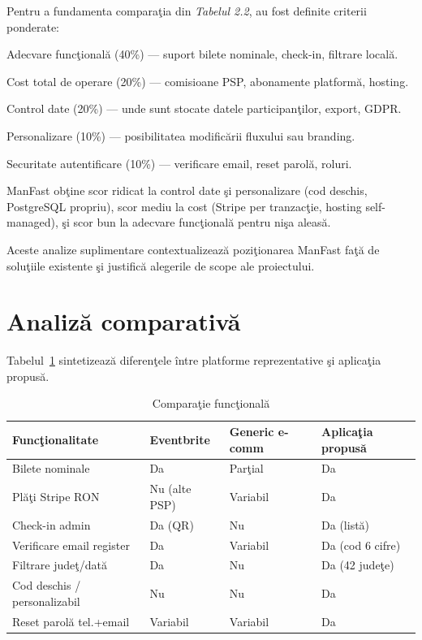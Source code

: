 Pentru a fundamenta compara\c tia din \textit{Tabelul 2.2}, au fost definite criterii ponderate:

Adecvare func\c tional\u a (40\%) — suport bilete nominale, check-in, filtrare local\u a.

Cost total de operare (20\%) — comisioane PSP, abonamente platform\u a, hosting.

Control date (20\%) — unde sunt stocate datele participan\c tilor, export, GDPR.

Personalizare (10\%) — posibilitatea modific\u arii fluxului sau branding.

Securitate autentificare (10\%) — verificare email, reset parol\u a, roluri.

ManFast ob\c tine scor ridicat la control date \c si personalizare (cod deschis, PostgreSQL propriu), scor mediu la cost (Stripe per tranzac\c tie, hosting self-managed), \c si scor bun la adecvare func\c tional\u a pentru ni\c sa aleas\u a.

Aceste analize suplimentare contextualizeaz\u a pozi\c tionarea ManFast fa\c t\u a de solu\c tiile \newline  existente \c si justific\u a alegerile de scope ale proiectului.

\section{Analiz\u a comparativ\u a}

Tabelul~\ref{tab:comparatie} sintetizeaz\u a diferen\c tele \^intre platforme reprezentative \c si aplica\c tia propus\u a.

\begin{table}[htbp]
	\centering
	\renewcommand{\arraystretch}{1.5} 
	\setlength{\tabcolsep}{6pt} 
	\begin{tabular}{|>{\raggedright\arraybackslash}p{3.5cm}|>{\raggedright\arraybackslash}p{2.2cm}|>{\raggedright\arraybackslash}p{2.5cm}|>{\raggedright\arraybackslash}p{3.5cm}|}
		\hline
		\textbf{Func\c tionalitate} & \textbf{Eventbrite} & \textbf{Generic e-comm} & \textbf{Aplica\c tia propus\u a} \\ \hline
		Bilete nominale & Da & Par\c tial & Da \\ \hline
		Pl\u a\c ti Stripe RON & Nu (alte PSP) & Variabil & Da \\ \hline
		Check-in admin & Da (QR) & Nu & Da (list\u a) \\ \hline
		Verificare email register & Da & Variabil & Da (cod 6 cifre) \\ \hline
		Filtrare jude\c t/dat\u a & Da & Nu & Da (42 jude\c te) \\ \hline
		Cod deschis / personalizabil & Nu & Nu & Da \\ \hline
		Reset parol\u a tel.+email & Variabil & Variabil & Da \\ \hline
	\end{tabular}
	\caption{Compara\c tie func\c tional\u a}
	\label{tab:comparatie}
\end{table}

